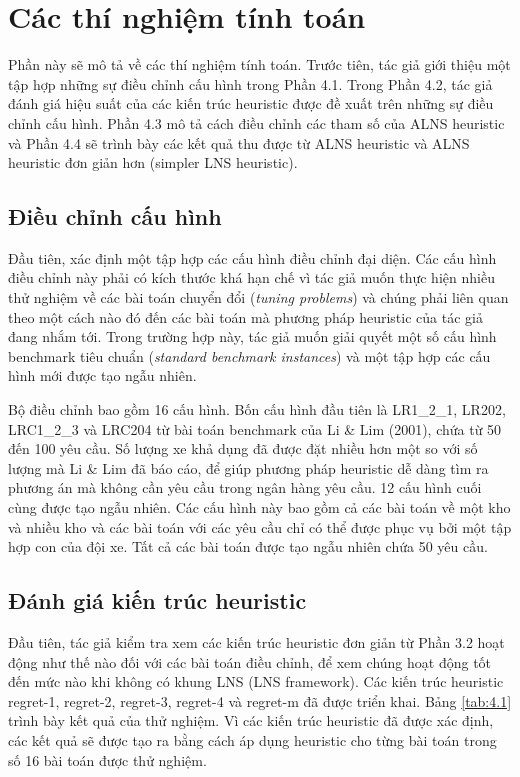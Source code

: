 \chapter{Các thí nghiệm tính toán}
Phần này sẽ mô tả về các thí nghiệm tính toán. Trước tiên, tác giả giới thiệu một tập hợp những sự điều chỉnh cấu hình trong Phần 4.1. Trong Phần 4.2, tác giả đánh giá hiệu suất của các kiến trúc heuristic được đề xuất trên những sự điều chỉnh cấu hình. Phần 4.3 mô tả cách điều chỉnh các tham số của ALNS heuristic và Phần 4.4 sẽ trình bày các kết quả thu được từ ALNS heuristic và ALNS heuristic đơn giản hơn (simpler LNS heuristic).

\section{Điều chỉnh cấu hình}
Đầu tiên, xác định một tập hợp các cấu hình điều chỉnh đại diện. Các cấu hình điều chỉnh này phải có kích thước khá hạn chế vì tác giả muốn thực hiện nhiều thử nghiệm về các bài toán chuyển đổi (\textit{tuning problems}) và chúng phải liên quan theo một cách nào đó đến các bài toán mà phương pháp heuristic của tác giả đang nhắm tới. Trong trường hợp này, tác giả muốn giải quyết một số cấu hình benchmark tiêu chuẩn (\textit{standard benchmark instances}) và một tập hợp các cấu hình mới được tạo ngẫu nhiên.

Bộ điều chỉnh bao gồm 16 cấu hình. Bốn cấu hình đầu tiên là LR1\_2\_1, LR202, LRC1\_2\_3 và LRC204 từ bài toán benchmark của Li \& Lim (2001), chứa từ 50 đến 100 yêu cầu. Số lượng xe khả dụng đã được đặt nhiều hơn một so với số lượng mà Li \& Lim đã báo cáo, để giúp phương pháp heuristic dễ dàng tìm ra phương án mà không cần yêu cầu trong ngân hàng yêu cầu. 12 cấu hình cuối cùng được tạo ngẫu nhiên. Các cấu hình này bao gồm cả các bài toán về một kho và nhiều kho và các bài toán với các yêu cầu chỉ có thể được phục vụ bởi một tập hợp con của đội xe. Tất cả các bài toán được tạo ngẫu nhiên chứa 50 yêu cầu.

\section{Đánh giá kiến trúc heuristic}
Đầu tiên, tác giả kiểm tra xem các kiến trúc heuristic đơn giản từ Phần 3.2 hoạt động như thế nào đối với các bài toán điều chỉnh, để xem chúng hoạt động tốt đến mức nào khi không có khung LNS (LNS framework). Các kiến trúc heuristic regret-1, regret-2, regret-3, regret-4 và regret-m đã được triển khai. Bảng \ref{tab:4.1} trình bày kết quả của thử nghiệm. Vì các kiến trúc heuristic đã được xác định, các kết quả sẽ được tạo ra bằng cách áp dụng heuristic cho từng bài toán trong số 16 bài toán được thử nghiệm.

